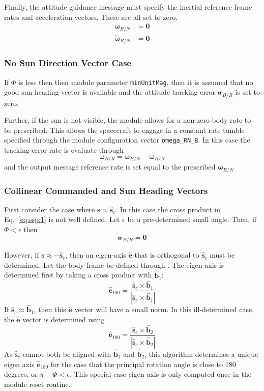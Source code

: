 Finally, the attitude guidance message must specify the inertial reference frame rates and acceleration vectors.  These are all set to zero.
\begin{align}
	\bm\omega_{R/N} &= \bm 0 \\
	\dot{\bm \omega}_{R/N} &= \bm 0
\end{align}

\subsubsection{No Sun Direction Vector Case}
 If $\Phi$ is less then then module parameter {\tt minUnitMag}, then it is assumed that no good sun heading vector is available and the attitude tracking error $\bm\sigma_{B/R}$ is set to zero.   
 
 Further, if the sun is not visible, the module allows for a non-zero body rate to be prescribed.  This allows the spacecraft to engage in a constant rate tumble specified through the module configuration vector {\tt omega\_RN\_B}.  In this case the tracking error rate is evaluate through
 \begin{equation}
 	\label{eq:ssp:6}
	\bm\omega_{B/R} = \bm\omega_{B/N} - \bm\omega_{R/N}
 \end{equation}
 and the output message reference rate is set equal to the prescribed $\bm\omega_{R/N}$

 
 \subsubsection{Collinear Commanded and Sun Heading Vectors}
First consider the case where $\bm s \approx \hat{\bm s}_{c}$.  In this case the cross product in Eq.~\eqref{eq:ssp:1} is not well defined.  Let $\epsilon$ be a pre-determined small angle.  Then, if $\Phi < \epsilon$ then 
$$
	\bm\sigma_{B/R} = \bm 0
$$
 
 
However, if $\bm s \approx -\hat{\bm s}_{c}$, then an eigen-axis $\hat{\bm e}$ that is orthogonal to $\hat{\bm s}_{c}$ must be determined.  Let the body frame be defined through .  The eigen-axis is determined first by taking a cross product with $\hat{\bm b}_{1}$:
 \begin{equation}
	\label{eq:ssp:7}
	\hat{\bm e}_{180} = \frac{ \hat{\bm s}_{c} \times \hat{\bm b}_{1}}{| \hat{\bm s}_{c} \times \hat{\bm b}_{1}|}
\end{equation}
If $\hat{\bm s}_{c} \approx \hat{\bm b}_{1}$, then this $\hat{\bm e}$ vector will have a small norm.  In this ill-determined case, the $\hat{\bm e}$ vector is determined using
 \begin{equation}
	\label{eq:ssp:8}
	\hat{\bm e}_{180} = \frac{ \hat{\bm s}_{c} \times \hat{\bm b}_{2}}{| \hat{\bm s}_{c} \times \hat{\bm b}_{2}|}
\end{equation}
As $ \hat{\bm s}_{c}$ cannot both be aligned with $\hat{\bm b}_{1}$ and $\hat{\bm b}_{2}$, this algorithm determines a unique eigen axis $\hat{\bm e}_{180}$ for the case that the principal rotation angle is close to 180 degrees, or $\pi - \Phi < \epsilon$.  This special case eigen axis is only computed once in the module reset routine.
 
 